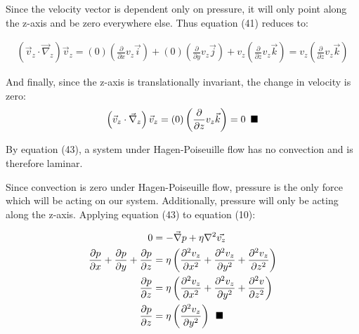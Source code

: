 \documentclass[titlepage]{article}
\begin{document}
    \noindent Since the velocity vector is dependent only on pressure, it will only point along the z-axis and be zero everywhere else. Thus equation (41) reduces to:

    \begin{align}
        \left(\vec{v}_{z}\cdot\vec{\nabla}_{z}\right)\vec{v}_{z}=\left(0\right)\left(\displaystyle\frac{\partial}{\partial{x}}v_{z}\vec{i}\right)+\left(0\right)\left(\displaystyle\frac{\partial}{\partial{y}}v_{z}\vec{j}\right)+v_{z}\left(\displaystyle\frac{\partial}{\partial{z}}v_{z}\vec{k}\right) 
        =v_{z}\left(\displaystyle\frac{\partial}{\partial{z}}v_{z}\vec{k}\right) 
    \end{align}

    \noindent And finally, since the z-axis is translationally invariant, the change in velocity is zero:
    \begin{align}
        \left(\vec{v}_{z}\cdot\vec{\nabla}_{z}\right)\vec{v}_{z}=\left(0\right)\left(\displaystyle\frac{\partial}{\partial{z}}v_{z}\vec{k}\right)=0\hspace*{5pt}\blacksquare
    \end{align}

    \noindent By equation (43), a system under Hagen-Poiseuille flow has no convection and is therefore laminar. 

    \newpage
    \noindent  Since convection is zero under Hagen-Poiseuille flow, pressure is the only force which will be acting on our system. Additionally, pressure will only be acting along the z-axis. Applying equation (43) to equation (10): 

    \begingroup
        \addtolength\jot{5pt}
        \begin{align}
            0&=-\vec{\nabla}p+\eta\nabla^2\vec{v_{z}}\\   
            \displaystyle\frac{\partial{p}}{\partial{x}}+\displaystyle\frac{\partial{p}}{\partial{y}}+\frac{\partial{p}}{\partial{z}}&=\eta\left(\displaystyle\frac{\partial^2{v_{z}}}{\partial{x}^2}+\displaystyle\frac{\partial^2{v_{z}}}{\partial{y}^2}+\displaystyle\frac{\partial^2{v_{z}}}{\partial{z}^2}\right) \\ 
            \displaystyle\frac{\partial{p}}{\partial{z}}&=\eta\left(\frac{\partial^2{v_{z}}}{\partial{x}^2}+\displaystyle\frac{\partial^2{v_{z}}}{\partial{y}^2}+\frac{\partial^2{v}}{\partial{z}^2}\right) \\
        \displaystyle\frac{\partial{p}}{\partial{z}}&=\eta\left(\displaystyle\frac{\partial^2{v_{z}}}{\partial{y}^2}\right)\hspace*{5pt}\blacksquare 
    \end{align} \\
\end{document}
